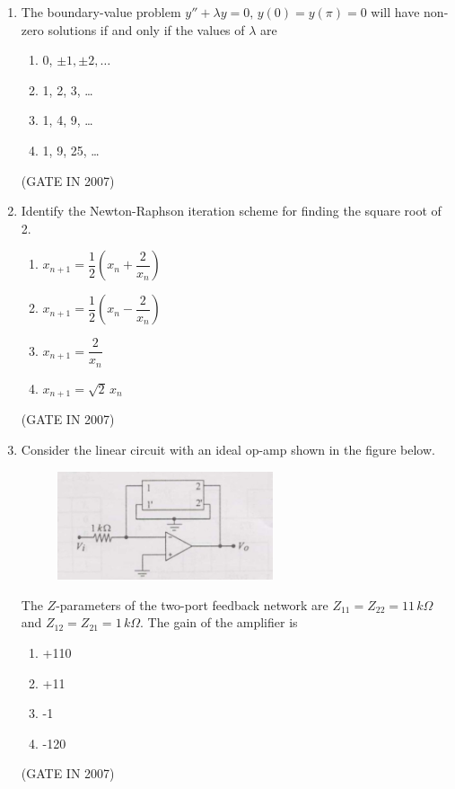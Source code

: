 \documentclass[journal]{IEEEtran}
\begin{document}
\begin{enumerate}
\item The boundary-value problem $y'' + \lambda y = 0, \, y(0)=y(\pi)=0$ will have non-zero solutions if and only if the values of $\lambda$ are  
\begin{multicols}{2}
\begin{enumerate}
\item 0, $\pm 1, \pm 2, \dots$  
\item 1, 2, 3, \dots  
\item 1, 4, 9, \dots  
\item 1, 9, 25, \dots  
\end{enumerate}
\end{multicols}

\hfill(GATE IN 2007)
\item Identify the Newton-Raphson iteration scheme for finding the square root of 2.  
\begin{multicols}{2}
\begin{enumerate}
\item $x_{n+1} = \dfrac{1}{2} \left(x_n + \dfrac{2}{x_n}\right)$  
\item $x_{n+1} = \dfrac{1}{2} \left(x_n - \dfrac{2}{x_n}\right)$  
\item $x_{n+1} = \dfrac{2}{x_n}$  
\item $x_{n+1} = \sqrt{2}\,x_n$  
\end{enumerate}
\end{multicols}
\hfill(GATE IN 2007)

\item Consider the linear circuit with an ideal op-amp shown in the figure below.  
\begin{figure}[H]
    \centering
      \includegraphics[width=0.6\textwidth]{13.jpg} 
      \caption{}
    \label{fig:fig13} 
\end{figure}
The $Z$-parameters of the two-port feedback network are $Z_{11} = Z_{22} = 11 \, k\Omega$ and $Z_{12} = Z_{21} = 1 \, k\Omega$. The gain of the amplifier is  
\begin{multicols}{4}
\begin{enumerate}
\item +110  
\item +11  
\item -1  
\item -120  
\end{enumerate}
\end{multicols}
\hfill(GATE IN 2007)


\end{enumerate}
\end{document}
